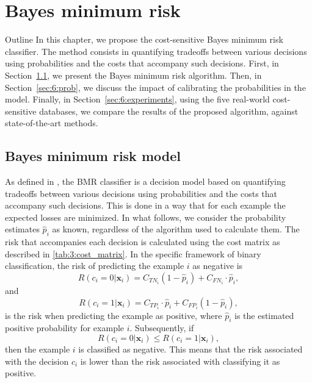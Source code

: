 \chapter{Bayes minimum risk}\label{ch:6}

\begin{remark}{Outline}
In this chapter, we propose the cost-sensitive Bayes minimum risk classifier. The method 
consists in quantifying tradeoffs between various decisions using probabilities and the costs that 
accompany such decisions. First, in Section~\ref{sec:6:bmr}, we present the Bayes minimum risk 
algorithm. Then, in Section~\ref{sec:6:prob}, we discuss the impact of calibrating the probabilities 
in the model. Finally, in Section~\ref{sec:6:experiments},  using the five real-world cost-sensitive 
databases, we compare the results of the proposed algorithm, against state-of-the-art methods.
\end{remark}


\section{Bayes minimum risk model}
\label{sec:6:bmr}


As defined in \citep{Ghosh2006}, the BMR classifier is a decision model based on quantifying 
tradeoffs between various decisions using probabilities and the costs that accompany such decisions. 
This is done in a way that for each example the expected losses are minimized. In  what follows, we 
consider the probability estimates $\hat p_i$ as known, regardless of the algorithm used to 
calculate them.  The risk that accompanies each decision is calculated using the cost matrix 
as described in \tablename{ \ref{tab:3:cost_matrix}}. In the specific framework of binary 
classification, the risk of predicting the example $i$ as negative is 
\begin{equation}
  R(c_i=0|\mathbf{x}_i)=C_{TN_i}(1-\hat p_i)+C_{FN_i} \cdot \hat p_i, 
\end{equation}
and
\begin{equation}
  R(c_i=1|\mathbf{x}_i)=C_{TP_i} \cdot \hat p_i + C_{FP_i}(1- \hat p_i), 
\end{equation}
is the risk when predicting the example as positive, where $\hat p_i$ is the estimated positive 
probability for example $i$. Subsequently, if 
\begin{equation}
  R(c_i=0|\mathbf{x}_i) \le R(c_i=1|\mathbf{x}_i), 
\end{equation}
then  the example $i$ is classified as negative. This means that the risk associated with the 
decision $c_i$ is lower than the risk associated with classifying it as positive. 


